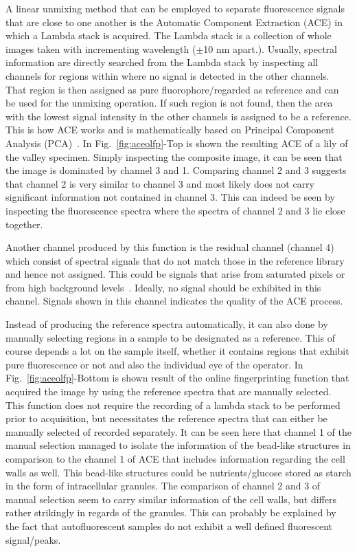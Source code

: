 A linear unmixing method that can be employed to separate fluorescence signals that are close to one another is the Automatic Component Extraction (ACE) in which a Lambda stack is acquired. 
The Lambda stack is a collection of whole images taken with incrementing wavelength ($\pm$10 nm apart.). 
Usually, spectral information are directly searched from the Lambda stack by inspecting all channels for regions within where no signal is detected in the other channels. 
That region is then assigned as pure fluorophore/regarded as reference and can be used for the unmixing operation. 
If such region is not found, then the area with the lowest signal intensity in the other channels is assigned to be a reference.
This is how ACE works and is mathematically based on Principal Component Analysis (PCA)~\cite{ZeissCamp2}.
In Fig.~\ref{fig:aceolfp}-Top is shown the resulting ACE of a lily of the valley specimen.
Simply inspecting the composite image, it can be seen that the image is dominated by channel 3 and 1. 
Comparing channel 2 and 3 suggests that channel 2 is very similar to channel 3 and most likely does not carry significant information not contained in channel 3. 
This can indeed be seen by inspecting the fluorescence spectra where the spectra of channel 2 and 3 lie close together.

Another channel produced by this function is the residual channel (channel 4) which consist of spectral signals that do not match those in the reference library and hence not assigned. 
This could be signals that arise from saturated pixels or from high background levels~\cite{ZeissCamp2}. 
Ideally, no signal should be exhibited in this channel. Signals shown in this channel indicates the quality of the ACE process.

Instead of producing the reference spectra automatically, it can also done by manually selecting regions in a sample to be designated as a reference. 
This of course depends a lot on the sample itself, whether it contains regions that exhibit pure fluorescence or not and also the individual eye of the operator. 
In Fig.~\ref{fig:aceolfp}-Bottom is shown result of the online fingerprinting function that acquired the image by using the reference spectra that are manually selected. This function does not require the recording of a lambda stack to be performed prior to acquisition, but necessitates the reference spectra that can either be manually selected of recorded separately.
It can be seen here that channel 1 of the manual selection managed to isolate the information of the bead-like structures in comparison to the channel 1 of ACE that includes information regarding the cell walls as well. 
This bead-like structures could be nutrients/glucose stored as starch in the form of intracellular granules. 
The comparison of channel 2 and 3 of manual selection seem to carry similar information of the cell walls, but differs rather strikingly in regards of the granules. 
This can probably be explained by the fact that autofluorescent samples do not exhibit a well defined fluorescent signal/peaks. 

